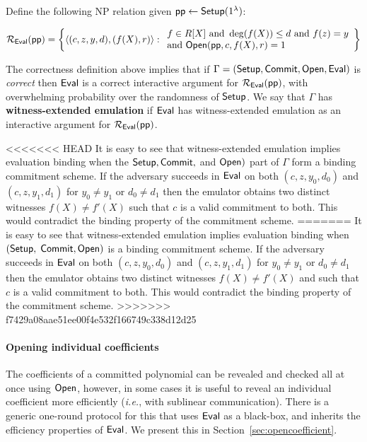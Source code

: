 Define the following NP relation given $\textsf{pp} \leftarrow \textsf{{Setup}}(1^\lambda)$: 
\begin{small}
\[ 
\mathcal{R_\textsf{Eval}}(\textsf{pp}) = \left\{
\langle (c, z, y, d), (f(X), r) \rangle
: 
\begin{array}{l} 
f \in R[X] \ \text{and} \ \deg(f(X)) \leq d \ \text{and} \ f(z) = y \\ 
 \text{and} \ \textsf{{Open}}(\textsf{pp}, c, f(X), r) = 1 \\
\end{array}
\right\}
\] 
\end{small}
The correctness definition above implies that if $\Gamma = (\textsf{{Setup}}, \textsf{{Commit}}, \textsf{{Open}}, \textsf{{Eval}})$ is \emph{correct} then $\textsf{{Eval}}$ is a correct interactive argument for $\mathcal{R_\textsf{Eval}}(\textsf{pp})$, with overwhelming probability over the randomness of $\textsf{{Setup}}$. We say that $\Gamma$ has \textbf{witness-extended emulation} if $\textsf{{Eval}}$ has witness-extended emulation as an interactive argument for $\mathcal{R_\textsf{Eval}}(\textsf{pp})$. 

<<<<<<< HEAD
It is easy to see that witness-extended emulation implies evaluation binding when the $\textsf{{Setup}}, \textsf{{Commit}},$ and $\textsf{{Open}})$ part of $\Gamma$ form a binding commitment scheme. If the adversary succeeds in $\textsf{{Eval}}$ on both $(c, z, y_0, d_0)$ and $(c, z, y_1, d_1)$ for $y_0 \neq y_1$ or $d_0 \neq d_1$ then the emulator obtains two distinct witnesses $f(X) \neq f'(X)$ such that $c$ is a valid commitment to both. This would contradict the binding property of the commitment scheme. 
=======
It is easy to see that witness-extended emulation implies evaluation binding when $(\textsf{{Setup}},$ $\textsf{{Commit}}, \textsf{{Open}})$ is a binding commitment scheme. If the adversary succeeds in $\textsf{{Eval}}$ on both $(c, z, y_0, d_0)$ and $(c, z, y_1, d_1)$ for $y_0 \neq y_1$ or $d_0 \neq d_1$ then the emulator obtains two distinct witnesses $f(X) \neq f'(X)$ and such that $c$ is a valid commitment to both. This would contradict the binding property of the commitment scheme. 
>>>>>>> f7429a08aae51ee00f4e532f166749c338d12d25

\paragraph{Opening individual coefficients} The coefficients of a committed polynomial can be revealed and checked all at once using $\textsf{{Open}}$, however, in some cases it is useful to reveal an individual coefficient more efficiently (\emph{i.e.}, with sublinear communication). 
There is a generic one-round protocol for this that uses $\textsf{{Eval}}$ as a black-box, and inherits the efficiency properties of $\textsf{{Eval}}$. We present this in Section~\ref{sec:opencoefficient}. 

